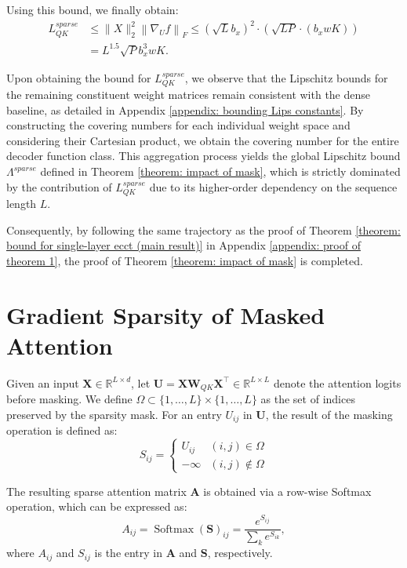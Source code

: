 \documentclass[lettersize,onecolumn]{IEEEtran}
\begin{document}
Using this bound, we finally obtain:
\begin{equation}
\begin{aligned}
    L_{QK}^{sparse} &\leq \|X\|_{2}^{2}\left\|\nabla_{U} f\right\|_{F} \leq (\sqrt{L}b_x)^{2}\cdot(\sqrt{LP}\cdot (b_x w K)) \\
    &=L^{1.5}\sqrt{P}b_{x}^{3}wK.
\end{aligned}
\end{equation}

Upon obtaining the bound for $L_{QK}^{sparse}$, we observe that the Lipschitz bounds for the remaining constituent weight matrices remain consistent with the dense baseline, as detailed in Appendix \ref{appendix: bounding Lips constants}. By constructing the covering numbers for each individual weight space and considering their Cartesian product, we obtain the covering number for the entire decoder function class. This aggregation process yields the global Lipschitz bound $\Lambda^{sparse}$ defined in Theorem \ref{theorem: impact of mask}, which is strictly dominated by the contribution of $L_{QK}^{sparse}$ due to its higher-order dependency on the sequence length $L$.

Consequently, by following the same trajectory as the proof of Theorem \ref{theorem: bound for single-layer ecct (main result)} in Appendix \ref{appendix: proof of theorem 1}, the proof of Theorem \ref{theorem: impact of mask} is completed.

\section{Gradient Sparsity of Masked Attention} \label{appendix: sparsity of masked attention gradient}

Given an input $\mathbf{X}\in \mathbb{R}^{L\times d}$, let $\mathbf{U}=\mathbf{X}\mathbf{W}_{QK}\mathbf{X}^{\top}\in  \mathbb{R}^{L\times L}$ denote the attention logits before masking. We define $\Omega\subset \{1,\ldots,L\}\times\{1,\ldots,L\}$ as the set of indices preserved by the sparsity mask. For an entry $U_{i j}$ in $\mathbf{U}$, the result of the masking operation is defined as:
\begin{equation}
    S_{i j}=\left\{\begin{array}{ll}
U_{i j} & (i, j) \in \Omega \\
-\infty & (i, j) \notin \Omega
\end{array}\right. 
\end{equation}

The resulting sparse attention matrix $\mathbf{A}$ is obtained via a row-wise Softmax operation, which can be expressed as:
\begin{equation}
    A_{i j}=\operatorname{Softmax}(\mathbf{S})_{i j}=\frac{e^{S_{i j}}}{\sum_{k} e^{S_{i k}}},
\end{equation}
where $A_{ij}$ and $S_{ij}$ is the entry in $\mathbf{A}$ and $\mathbf{S}$, respectively.
\end{document}
